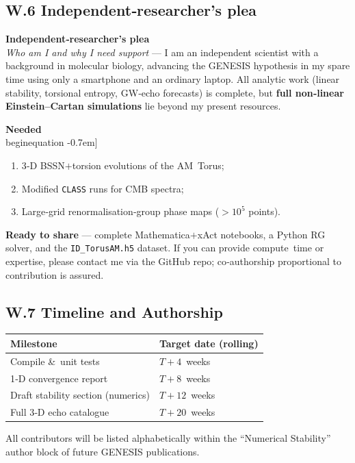 \documentclass{article}
\begin{document}
\subsection*{W.6  Independent‑researcher’s plea}

\begin{tcolorbox}[enhanced,width=\linewidth,
  colframe=black,colback=gray!8,
  colbacktitle=black,coltitle=white,
  title=Call for Collaboration,fonttitle=\bfseries,
  left=2mm,right=2mm,top=0.8mm,bottom=0.8mm,boxrule=0.4pt]

\textbf{Independent‑researcher’s plea}\\
\emph{Who am I and why I need support} —  
I am an independent scientist with a background in molecular biology, 
advancing the GENESIS hypothesis in my spare time using only a smartphone 
and an ordinary laptop.  All analytic work (linear stability, torsional 
entropy, GW‑echo forecasts) is complete, but \textbf{full non‑linear 
Einstein–Cartan simulations} lie beyond my present resources.

\medskip\noindent
\textbf{Needed}\\begin{equation}\label{eq:auto239}
-0.7em]
\begin{enumerate}
  \item 3‑D BSSN$+$torsion evolutions of the AM Torus;
  \item Modified \texttt{CLASS} runs for CMB spectra;
  \item Large‑grid renormalisation‑group phase maps ($>10^{5}$ points).
\end{enumerate}

\medskip\noindent
\textbf{Ready to share} — complete Mathematica$+$xAct notebooks, a Python RG
solver, and the \texttt{ID\_TorusAM.h5} dataset.  
If you can provide compute time or expertise, please contact me via the 
GitHub repo; co‑authorship proportional to contribution is assured.
\end{tcolorbox}

\subsection*{W.7  Timeline and Authorship}
\begin{center}
\begin{tabular}{@{}l|l@{}}
\textbf{Milestone} & \textbf{Target date (rolling)}\\\hline
Compile \& unit tests & $T+4$ weeks\\
1‑D convergence report & $T+8$ weeks\\
Draft stability section (numerics) & $T+12$ weeks\\
Full 3‑D echo catalogue & $T+20$ weeks\\
\end{tabular}
\end{center}
All contributors will be listed alphabetically within the “Numerical 
Stability” author block of future GENESIS publications.
\end{document}

